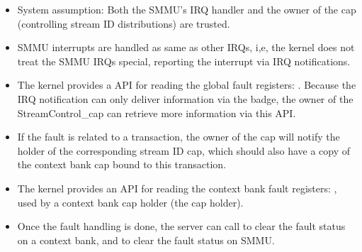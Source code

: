 \begin{itemize}
\item System assumption: Both the SMMU's IRQ handler and the owner of the
     cap (controlling stream ID distributions) are trusted.
\item SMMU interrupts are handled as same as other IRQs, i,e, the kernel does not
    treat the SMMU IRQs special, reporting the interrupt via IRQ notifications.
\item The kernel provides a API for reading the global fault registers: 
    . Because
    the IRQ notification can only deliver information via the badge, the owner
    of the StreamControl\_cap can retrieve more information via this API.
\item If the fault is related to a transaction, the owner of the
     cap will notify the holder of the corresponding
    stream ID cap, which should also have a copy of the context bank cap bound to
    this transaction.
\item The kernel provides an API for reading the context bank fault registers:
    , used by a context bank
    cap holder (the  cap holder).
\item Once the fault handling is done, the server can call
     to clear the fault
    status on a context bank, and 
    to clear the fault status on SMMU.
\end{itemize}

